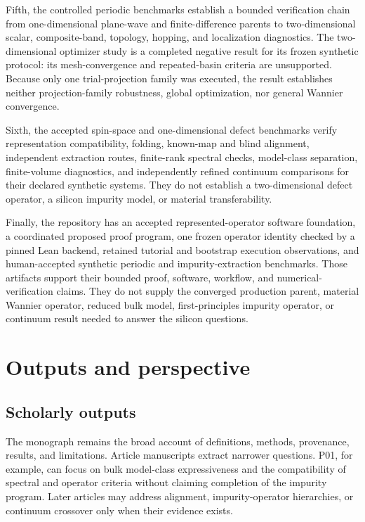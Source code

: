 Fifth, the controlled periodic benchmarks establish a bounded verification
chain from one-dimensional plane-wave and finite-difference parents to
two-dimensional scalar, composite-band, topology, hopping, and localization
diagnostics. The two-dimensional optimizer study is a completed negative result
for its frozen synthetic protocol: its mesh-convergence and repeated-basin
criteria are unsupported. Because only one trial-projection family was
executed, the result establishes neither projection-family robustness, global
optimization, nor general Wannier convergence.

Sixth, the accepted spin-space and one-dimensional defect benchmarks verify
representation compatibility, folding, known-map and blind alignment,
independent extraction routes, finite-rank spectral checks, model-class
separation, finite-volume diagnostics, and independently refined continuum
comparisons for their declared synthetic systems. They do not establish a
two-dimensional defect operator, a silicon impurity model, or material
transferability.

Finally, the repository has an accepted represented-operator software
foundation, a coordinated proposed proof program, one frozen operator identity
checked by a pinned Lean backend, retained tutorial and bootstrap execution
observations, and human-accepted synthetic periodic and impurity-extraction
benchmarks. Those artifacts support their bounded proof, software, workflow,
and numerical-verification claims. They do not supply the converged production
parent, material Wannier operator, reduced bulk model, first-principles impurity
operator, or continuum result needed to answer the silicon questions.

\section{Outputs and perspective}

\subsection{Scholarly outputs}


The monograph remains the broad account of definitions, methods, provenance,
results, and limitations. Article manuscripts extract narrower questions.
P01, for example, can focus on bulk model-class expressiveness and the
compatibility of spectral and operator criteria without claiming completion of
the impurity program. Later articles may address alignment, impurity-operator
hierarchies, or continuum crossover only when their evidence exists.

